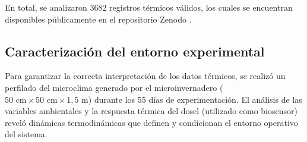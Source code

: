 En total, se analizaron 3682 registros térmicos válidos, los cuales se encuentran disponibles públicamente en el repositorio Zenodo .

\subsection{Caracterización del entorno experimental}
\label{subsec:caracterizacion_invernadero}

Para garantizar la correcta interpretación de los datos térmicos, se realizó un perfilado del microclima generado por el microinvernadero ($50\text{ cm} \times 50\text{ cm} \times 1,5\text{ m}$) durante los 55 días de experimentación. El análisis de las variables ambientales y la respuesta térmica del dosel (utilizado como biosensor) reveló dinámicas termodinámicas que definen y condicionan el entorno operativo del sistema.

